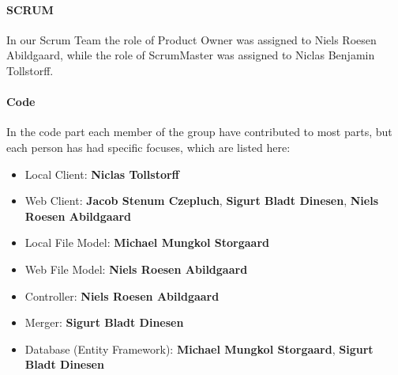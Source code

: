\paragraph{SCRUM}
In our Scrum Team the role of Product Owner was assigned to Niels Roesen Abildgaard, while the role of ScrumMaster was assigned to Niclas Benjamin Tollstorff.

\paragraph{Code}
In the code part each member of the group have contributed to most parts, but each person has had specific focuses, which are listed here:\\

\begin{itemize}
\item Local Client: \textbf{Niclas Tollstorff}
\item Web Client: \textbf{Jacob Stenum Czepluch}, \textbf{Sigurt Bladt Dinesen}, \textbf{Niels Roesen Abildgaard}
\item Local File Model: \textbf{Michael Mungkol Storgaard}
\item Web File Model: \textbf{Niels Roesen Abildgaard}
\item Controller: \textbf{Niels Roesen Abildgaard}
\item Merger: \textbf{Sigurt Bladt Dinesen}
\item Database (Entity Framework): \textbf{Michael Mungkol Storgaard}, \textbf{Sigurt Bladt Dinesen}
\end{itemize}
